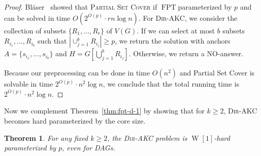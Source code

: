 \documentclass[11pt,a4paper]{article}
\newtheorem{theorem}{Theorem}
\DeclareMathOperator{\operatorClassFPT}{FPT}
\newcommand{\classFPT}{\ensuremath{\operatorClassFPT}}
\DeclareMathOperator{\operatorClassW}{W}
\newcommand{\classW}[1]{\ensuremath{\operatorClassW[#1]}}
\newcommand{\DAKC}{\textsc{Dir-AKC}\xspace}
\newcommand{\psc}{\textsc{Partial Set Cover}\xspace}
\begin{document}
\begin{proof}
Bl\"{a}ser~\cite{Blaser03} showed that \psc if \classFPT parameterized by $p$ and can be solved in time $O(2^{O(p)}\cdot r
n\log n)$.
For \DAKC, 
we consider the collection of subsets $\{R_1,\ldots,R_r\}$ of $V(G)$. If we can select at most $b$
subsets $R_{i_1},\ldots,R_{i_{b}}$ such that  $|\cup_{j=1}^{b}R_{i_j}|\geq p$, we return the solution with anchors
$A=\{s_{i_1},\ldots,s_{i_{b}}\}$ and $H=G[\bigcup_{j=1}^{b}R_{i_j}]$. Otherwise, we return a NO-answer.

Because our preprocessing can be done in time $O(n^2)$ and  {\sc Partial Set Cover} is solvable in time $2^{O(p)}\cdot n^2\log
n$, we conclude that the total running time is $2^{O(p)}\cdot n^2\log n$.
\end{proof}

Now we complement Theorem~\ref{thm:fpt-d-1} by showing that for $k\geq 2$,  \DAKC becomes hard
parameterized by the core size.

\begin{theorem}\label{thm:w-saved}
For any fixed $k\geq 2$, the \DAKC problem is \classW1-hard parameterized by $p$, even for DAGs.
\end{theorem}
\end{document}
